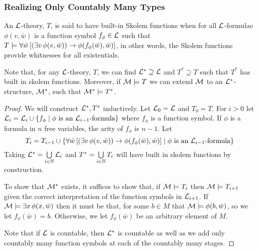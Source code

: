 \subsubsection{Realizing Only Countably Many Types}

\begin{definition}\label{definition_skolem_functions}
An \(\mathcal{L}\)-theory, \(T\), is said to have built-in Skolem functions when for all \(\mathcal{L}\)-formulae \(\phi(v, \bar{w})\) is a function symbol \(f_\phi \in \mathcal{L}\) such that \(T \models \forall \bar{w} \left[(\exists v \, \phi(v, \bar{w})) \to \phi(f_\phi(\bar{w}), \bar{w})\right]\), in other words, the Skolem functions provide whitnesses for all existentials. 
\end{definition}

\begin{theorem}\label{theorem_skolem_function_extension}
Note that, for any \(\mathcal{L}\)-theory, \(T\), we can find \(\mathcal{L}^* \supseteq \mathcal{L}\) and \(T^* \supseteq T\) such that \(T^*\) has built in skolem functions. 
Moreover, if \(\mathcal{M} \models T\) we can extend \(\mathcal{M}\) to an \(\mathcal{L}^*\)-structure, \(\mathcal{M}^*\), such that \(\mathcal{M}^* \models T^*\). 
\end{theorem}

\begin{proof}
We will construct \(\mathcal{L}^*, T^*\) inductively. 
Let \(\mathcal{L}_0 = \mathcal{L}\) and \(T_0 = T\). 
For \(i > 0\) let \(\mathcal{L}_i = \mathcal{L}_i \cup \{f_\phi \mid \phi \text{ is an } \mathcal{L}_{i-1}\text{-formula}\}\) where \(f_\phi\) is a function symbol.
If \(\phi\) is a formula in \(n\) free variables, the arity of \(f_\phi\) is \(n-1\). 
Let \[T_i = T_{i-1} \cup \{\forall \bar{w} \left[(\exists v \, \phi(v, \bar{w})) \to \phi(f_\phi(\bar{w}), \bar{w})\right] \mid \phi \text{ is an } \mathcal{L}_{i-1}\text{-formula}\}\]
Taking \(\mathcal{L}^* = \bigcup\limits_{i \in \mathbb{N}} \mathcal{L}_i\) and \(T^* = \bigcup\limits_{i \in \mathbb{N}} T_i\) will have built in skolem functions by construction.

To show that \(\mathcal{M}^*\) exists, it suffices to show that, if \(\mathcal{M} \models T_i\) then \(\mathcal{M} \models T_{i+1}\) given the correct interpretation of the function symbols in \(\mathcal{L}_{i+1}\).
If \(\mathcal{M} \models \exists x \, \phi(x, \bar{w})\) then it must be that, for some \(b \in M\) that \(\mathcal{M} \models \phi(b, \bar{w})\), so we let \(f_\phi(\bar{w}) = b\). 
Otherwise, we let \(f_\phi(\bar{w})\) be an arbitrary element of \(M\). 

Note that if \(\mathcal{L}\) is countable, then \(\mathcal{L}^*\) is countable as well as we add only countably many function symbols at each of the countably many stages.
\end{proof}

